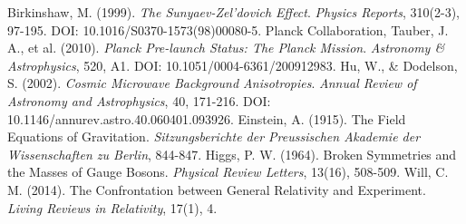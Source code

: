 ﻿\documentclass[12pt,a4paper]{article}
\begin{document}
\begin{thebibliography}{99}
		 Birkinshaw, M. (1999). \textit{The Sunyaev-Zel'dovich Effect}. \textit{Physics Reports}, 310(2-3), 97-195. DOI: 10.1016/S0370-1573(98)00080-5.
		 Planck Collaboration, Tauber, J. A., et al. (2010). \textit{Planck Pre-launch Status: The Planck Mission}. \textit{Astronomy \& Astrophysics}, 520, A1. DOI: 10.1051/0004-6361/200912983.
		 Hu, W., \& Dodelson, S. (2002). \textit{Cosmic Microwave Background Anisotropies}. \textit{Annual Review of Astronomy and Astrophysics}, 40, 171-216. DOI: 10.1146/annurev.astro.40.060401.093926.
		 Einstein, A. (1915). The Field Equations of Gravitation. \textit{Sitzungsberichte der Preussischen Akademie der Wissenschaften zu Berlin}, 844-847.
		 Higgs, P. W. (1964). Broken Symmetries and the Masses of Gauge Bosons. \textit{Physical Review Letters}, 13(16), 508-509.
		 Will, C. M. (2014). The Confrontation between General Relativity and Experiment. \textit{Living Reviews in Relativity}, 17(1), 4.
	\end{thebibliography}
	
\end{document}
